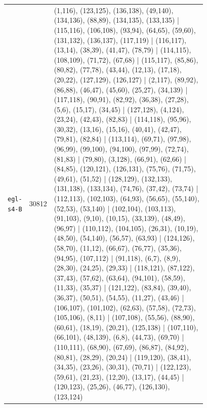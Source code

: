 \begin{landscape}
\begin{longtable}{lr>{\tiny\raggedright\arraybackslash}p{0.78\linewidth}}
\texttt{egl-s4-B} & 30812 & (1,116), (123,125), (136,138), (49,140), (134,136), (88,89), (134,135), (133,135) | (115,116), (106,108), (93,94), (64,65), (59,60), (131,132), (136,137), (117,119) | (116,117), (13,14), (38,39), (41,47), (78,79) | (114,115), (108,109), (71,72), (67,68) | (115,117), (85,86), (80,82), (77,78), (43,44), (12,13), (17,18), (20,22), (127,129), (126,127) | (2,117), (89,92), (86,88), (46,47), (45,60), (25,27), (34,139) | (117,118), (90,91), (82,92), (36,38), (27,28), (5,6), (15,17), (34,45) | (127,128), (4,124), (23,24), (42,43), (82,83) | (114,118), (95,96), (30,32), (13,16), (15,16), (40,41), (42,47), (79,81), (82,84) | (113,114), (69,71), (97,98), (96,99), (99,100), (94,100), (97,99), (72,74), (81,83) | (79,80), (3,128), (66,91), (62,66) | (84,85), (120,121), (126,131), (75,76), (71,75), (49,61), (51,52) | (128,129), (132,133), (131,138), (133,134), (74,76), (37,42), (73,74) | (112,113), (102,103), (64,93), (56,65), (55,140), (52,53), (53,140) | (102,104), (103,113), (91,103), (9,10), (10,15), (33,139), (48,49), (96,97) | (110,112), (104,105), (26,31), (10,19), (48,50), (54,140), (56,57), (63,93) | (124,126), (58,70), (11,12), (66,67), (76,77), (35,36), (94,95), (107,112) | (91,118), (6,7), (8,9), (28,30), (24,25), (29,33) | (118,121), (87,122), (37,43), (57,62), (63,64), (94,101), (58,59), (11,33), (35,37) | (121,122), (83,84), (39,40), (36,37), (50,51), (54,55), (11,27), (43,46) | (106,107), (101,102), (62,63), (57,58), (72,73), (105,106), (8,11) | (107,108), (55,56), (88,90), (60,61), (18,19), (20,21), (125,138) | (107,110), (66,101), (48,139), (6,8), (44,73), (69,70) | (110,111), (68,90), (67,69), (86,87), (84,92), (80,81), (28,29), (20,24) | (119,120), (38,41), (34,35), (23,26), (30,31), (70,71) | (122,123), (59,61), (21,23), (12,20), (13,17), (44,45) | (120,123), (25,26), (46,77), (126,130), (123,124) \\[2pt]

\end{longtable}
\end{landscape}
